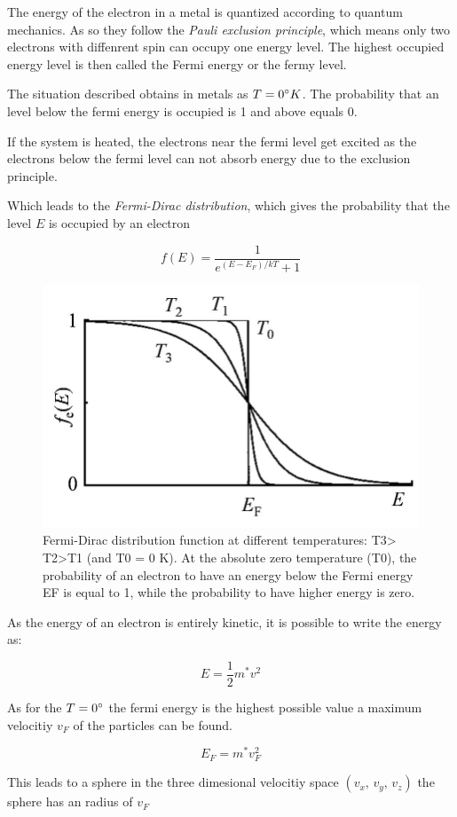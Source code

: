 The energy of the electron in a metal is quantized according to quantum mechanics.
As so they follow the \textit{Pauli exclusion principle}, which means only two 
electrons with diffenrent spin can occupy one energy level.
The highest occupied energy level is then called the Fermi energy or the fermy
level.

The situation described obtains in metals as $T=0 \degree K$. The probability that 
an level below the fermi energy is occupied is 1 and above equals 0.

If the system is heated, the electrons near the fermi level get excited as 
the electrons below the fermi level can not absorb energy due to the exclusion
principle.

Which leads to the \textit{Fermi-Dirac distribution}, which gives
the probability that the level $E$ is occupied by an electron

\begin{equation}
    f(E) = \frac{1}{e^{(E-E_F)/kT}+1}
\end{equation}

\begin{figure}[H]
    \centering
    \includegraphics[width=0.5\linewidth]{Graphics/Chapter1/Fermi-Dirac-distribution.png}
    \caption{Fermi-Dirac distribution function at different temperatures: T3> T2>T1
     (and T0 = 0 K). At the absolute zero temperature (T0), the probability of an 
     electron to have an energy below the Fermi energy EF is equal to 1, while the 
     probability to have higher energy is zero. \cite{fermi_dist}}
    \label{}
\end{figure}

As the energy of an electron is entirely kinetic, it is possible
to write the energy as:

$$E = \frac{1}{2} m^* v^2$$

As for the $T=0 \degree$ the fermi energy is the highest possible value
a maximum velocitiy $v_F$ of the particles can be found. 

$$E_F = m^*v_F^2$$

This leads to a sphere in the three dimesional velocitiy space
$(v_x, \, v_y, \, v_z)$ the sphere has an radius of $v_F$


